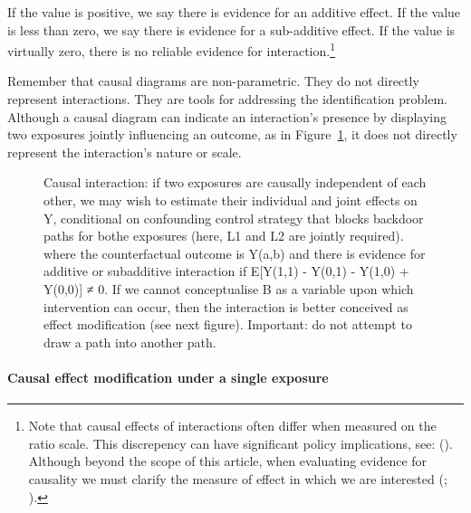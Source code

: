 \documentclass[
  singlecolumn,
  9pt]{article}
\let\oldparagraph\paragraph
\renewcommand{\paragraph}[1]{\oldparagraph{#1}\mbox{}}
\begin{document}
If the value is positive, we say there is evidence for an additive
effect. If the value is less than zero, we say there is evidence for a
sub-additive effect. If the value is virtually zero, there is no
reliable evidence for interaction.\footnote{Note that causal effects of
  interactions often differ when measured on the ratio scale. This
  discrepency can have significant policy implications, see:
  (). Although
  beyond the scope of this article, when evaluating evidence for
  causality we must clarify the measure of effect in which we are
  interested (;
  ).}

Remember that causal diagrams are non-parametric. They do not directly
represent interactions. They are tools for addressing the identification
problem. Although a causal diagram can indicate an interaction's
presence by displaying two exposures jointly influencing an outcome, as
in Figure~\ref{fig-dag-interaction}, it does not directly represent the
interaction's nature or scale.

\begin{figure}


\caption{\label{fig-dag-interaction}Causal interaction: if two exposures
are causally independent of each other, we may wish to estimate their
individual and joint effects on Y, conditional on confounding control
strategy that blocks backdoor paths for bothe exposures (here, L1 and L2
are jointly required). where the counterfactual outcome is Y(a,b) and
there is evidence for additive or subadditive interaction if E{[}Y(1,1)
- Y(0,1) - Y(1,0) + Y(0,0){]} ≠ 0. If we cannot conceptualise B as a
variable upon which intervention can occur, then the interaction is
better conceived as effect modification (see next figure). Important: do
not attempt to draw a path into another path.}

\end{figure}%

\paragraph{\texorpdfstring{\textbf{Causal effect modification under a
single
exposure}}{Causal effect modification under a single exposure}}\label{causal-effect-modification-under-a-single-exposure}
\end{document}
